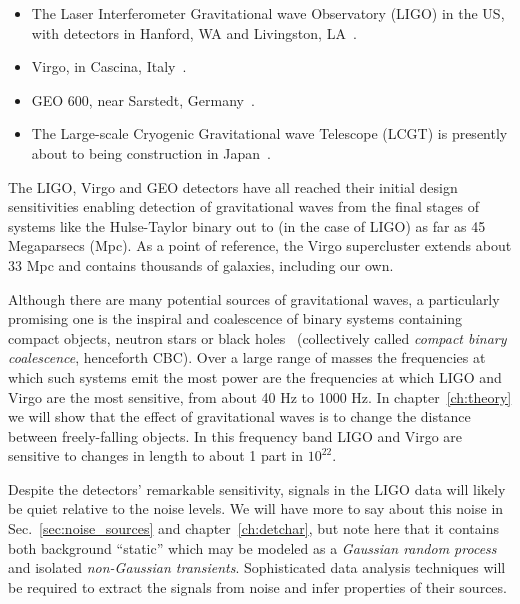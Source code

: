 \begin{itemize}

\item The Laser Interferometer Gravitational wave Observatory (LIGO)
in the US, with detectors in Hanford, WA and Livingston,
LA~\cite{Sigg:2008}.

\item Virgo, in Cascina, Italy~\cite{Acernese:2008}.

\item GEO 600, near Sarstedt, Germany~\cite{Grote:2008}.

\item The Large-scale Cryogenic Gravitational wave Telescope (LCGT) is
presently about to being construction in
Japan~\cite{0264-9381-27-8-084004}.
\end{itemize}

The LIGO, Virgo and GEO detectors have all reached their initial
design sensitivities enabling detection of gravitational waves from
the final stages of systems like the Hulse-Taylor binary out to (in
the case of LIGO) as far as 45 Megaparsecs (Mpc).  As a point of
reference, the Virgo supercluster extends about 33 Mpc and contains
thousands of galaxies, including our own.

Although there are many potential sources of gravitational waves, a
particularly promising one is the inspiral and coalescence of binary
systems containing compact objects, neutron stars or black
holes~\cite{thorne.k:1987} (collectively called \emph{compact binary
coalescence}, henceforth CBC).  Over a large range of masses the
frequencies at which such systems emit the most power are the
frequencies at which LIGO and Virgo are the most sensitive, from about
40 Hz to 1000 Hz.  In chapter~\ref{ch:theory} we will show that the
effect of gravitational waves is to change the distance between
freely-falling objects.  In this frequency band LIGO and Virgo are
sensitive to changes in length to about 1 part in $10^{22}$.

Despite the detectors' remarkable sensitivity, signals in the LIGO
data will likely be quiet relative to the noise levels.  We will have
more to say about this noise in Sec.~\ref{sec:noise_sources} and
chapter~\ref{ch:detchar}, but note here that it contains both
background ``static'' which may be modeled as a \emph{Gaussian random
process} and isolated \emph{non-Gaussian transients}.  Sophisticated
data analysis techniques will be required to extract the signals from
noise and infer properties of their sources.

